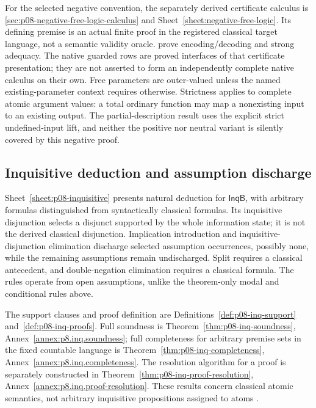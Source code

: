 For the selected negative convention, the separately derived certificate
calculus is \cref{sec:p08-negative-free-logic-calculus} and
Sheet~\ref{sheet:negative-free-logic}. Its defining premise is an actual
finite proof in the registered classical target language, not a semantic
validity oracle. 
prove encoding/decoding and strong adequacy. The native guarded rows are
proved interfaces of that certificate presentation; they are not asserted
to form an independently complete native calculus on their own.
Free parameters are outer-valued unless the named existing-parameter
context requires otherwise. Strictness applies to complete atomic
argument values: a total ordinary function may map a nonexisting input to
an existing output. The partial-description result uses the explicit strict
undefined-input lift, and neither the positive nor neutral variant is
silently covered by this negative proof.


\subsection{Inquisitive deduction and assumption discharge}

Sheet~\ref{sheet:p08-inquisitive} presents natural deduction for
\(\mathsf{InqB}\), with arbitrary formulas distinguished from syntactically
classical formulas.  Its inquisitive disjunction selects a disjunct supported
by the whole information state; it is not the derived classical
disjunction.  Implication introduction and inquisitive-disjunction
elimination discharge selected assumption occurrences, possibly none, while
the remaining assumptions remain undischarged.  Split requires a classical
antecedent, and double-negation elimination requires a classical formula.
The rules operate from open assumptions, unlike the theorem-only modal and
conditional rules above.

The support clauses and proof definition are
Definitions~\ref{def:p08-inq-support} and~\ref{def:p08-inq-proofs}.
Full soundness is Theorem~\ref{thm:p08-inq-soundness},
Annex~\ref{annex:p8.inq.soundness}; full completeness for arbitrary premise
sets in the fixed countable language is
Theorem~\ref{thm:p08-inq-completeness},
Annex~\ref{annex:p8.inq.completeness}.  The resolution algorithm for a proof
is separately constructed in Theorem~\ref{thm:p08-inq-proof-resolution},
Annex~\ref{annex:p8.inq.proof-resolution}.  These results concern classical
atomic semantics, not arbitrary inquisitive propositions assigned to atoms
\cite[\S\S3.5--3.8]{Ciardelli2023InquisitivePropositional}.

